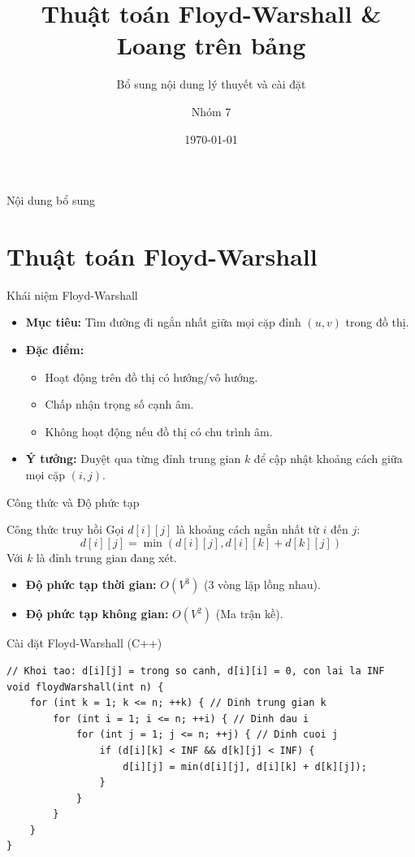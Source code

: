\documentclass[aspectratio=169]{beamer}
\title{Thuật toán Floyd-Warshall \& Loang trên bảng}
\subtitle{Bổ sung nội dung lý thuyết và cài đặt}
\author{Nhóm 7}
\date{\today}
\begin{document}
\begin{frame}
\titlepage
\end{frame}

\begin{frame}{Nội dung bổ sung}
\tableofcontents
\end{frame}

\section{Thuật toán Floyd-Warshall}

\begin{frame}{Khái niệm Floyd-Warshall}
\begin{itemize}
    \item \textbf{Mục tiêu:} Tìm đường đi ngắn nhất giữa mọi cặp đỉnh $(u, v)$ trong đồ thị.
    \item \textbf{Đặc điểm:} 
    \begin{itemize}
        \item Hoạt động trên đồ thị có hướng/vô hướng.
        \item Chấp nhận trọng số cạnh âm.
        \item Không hoạt động nếu đồ thị có chu trình âm.
    \end{itemize}
    \item \textbf{Ý tưởng:} Duyệt qua từng đỉnh trung gian $k$ để cập nhật khoảng cách giữa mọi cặp $(i, j)$.
\end{itemize}
\end{frame}

\begin{frame}{Công thức và Độ phức tạp}
\begin{block}{Công thức truy hồi}
Gọi $d[i][j]$ là khoảng cách ngắn nhất từ $i$ đến $j$:
\[
d[i][j] = \min(d[i][j], d[i][k] + d[k][j])
\]
Với $k$ là đỉnh trung gian đang xét.
\end{block}

\begin{itemize}
    \item \textbf{Độ phức tạp thời gian:} $O(V^3)$ (3 vòng lặp lồng nhau).
    \item \textbf{Độ phức tạp không gian:} $O(V^2)$ (Ma trận kề).
\end{itemize}
\end{frame}

\begin{frame}[fragile]{Cài đặt Floyd-Warshall (C++)}
\begin{lstlisting}
// Khoi tao: d[i][j] = trong so canh, d[i][i] = 0, con lai la INF
void floydWarshall(int n) {
    for (int k = 1; k <= n; ++k) { // Dinh trung gian k
        for (int i = 1; i <= n; ++i) { // Dinh dau i
            for (int j = 1; j <= n; ++j) { // Dinh cuoi j
                if (d[i][k] < INF && d[k][j] < INF) {
                    d[i][j] = min(d[i][j], d[i][k] + d[k][j]);
                }
            }
        }
    }
}
\end{lstlisting}
\end{frame}
\end{document}
